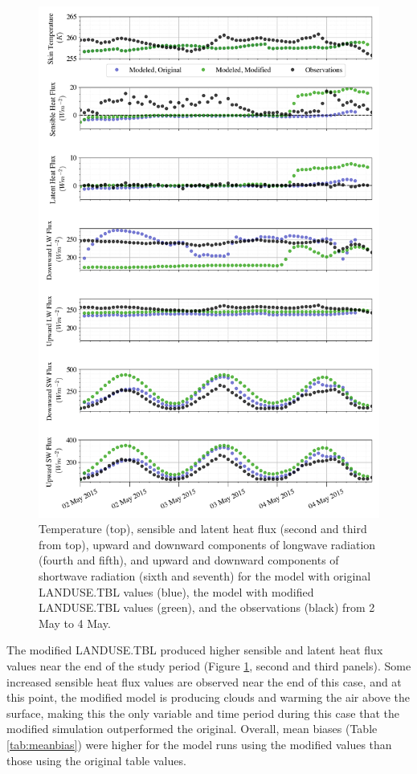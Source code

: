 \begin{figure}[p]
    \centering
    \vspace*{-3cm}
    \includegraphics[width=1\linewidth]{figures/chapter6/case2_all_new.png}
    \caption[Idealized Case 2]{Temperature (top), sensible and latent heat flux (second and third from top), upward and downward components of longwave radiation (fourth and fifth), and upward and downward components of shortwave radiation (sixth and seventh) for the model with original LANDUSE.TBL values (blue), the model with modified LANDUSE.TBL values (green), and the observations (black) from 2 May to 4 May.}
    \label{fig:c2}
\end{figure}

The modified LANDUSE.TBL produced higher sensible and latent heat flux values near the end of the study period (Figure \ref{fig:c2}, second and third panels). Some increased sensible heat flux values are observed near the end of this case, and at this point, the modified model is producing clouds and warming the air above the surface, making this the only variable and time period during this case that the modified simulation outperformed the original. Overall, mean biases (Table \ref{tab:meanbias}) were higher for the model runs using the modified values than those using the original table values.

